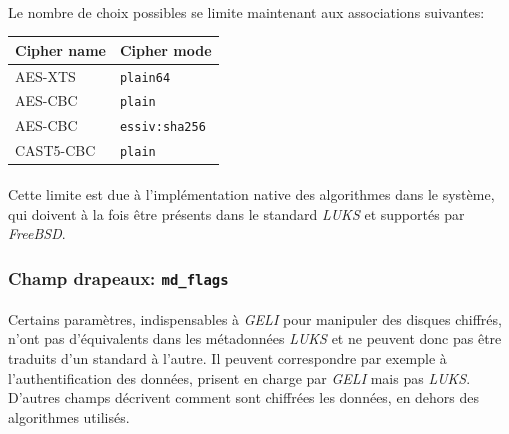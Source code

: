\paragraph{}
Le nombre de choix possibles se limite maintenant aux associations suivantes:
\begin{center}
  \begin{tabular}{ | l | l | }
    \hline
    \textbf{Cipher name} & \textbf{Cipher mode}  \\
    \hline
    AES-XTS              & \texttt{plain64}      \\
    AES-CBC              & \texttt{plain}        \\
    AES-CBC              & \texttt{essiv:sha256} \\
    CAST5-CBC            & \texttt{plain}        \\
    \hline
  \end{tabular}
\end{center}
\paragraph{}
Cette limite est due à l'implémentation native des algorithmes dans le système,
qui doivent à la fois être présents dans le standard \textit{LUKS} et supportés
par \textit{FreeBSD}.


\subsubsection{Champ drapeaux: \texttt{md\_flags}}
\paragraph{}
Certains paramètres, indispensables à \textit{GELI} pour manipuler des disques
chiffrés, n'ont pas d'équivalents dans les métadonnées \textit{LUKS} et ne
peuvent donc pas être traduits d'un standard à l'autre. Il peuvent correspondre
par exemple à l'authentification des données, prisent en charge par \textit{GELI}
mais pas \textit{LUKS}. D'autres champs décrivent comment sont chiffrées les
données, en dehors des algorithmes utilisés.
